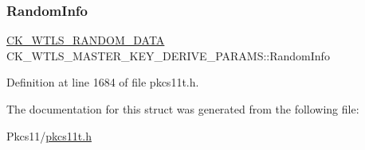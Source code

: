 \subsubsection{\texorpdfstring{Random\+Info}{RandomInfo}}
{\footnotesize\ttfamily \hyperlink{struct_c_k___w_t_l_s___r_a_n_d_o_m___d_a_t_a}{C\+K\+\_\+\+W\+T\+L\+S\+\_\+\+R\+A\+N\+D\+O\+M\+\_\+\+D\+A\+TA} C\+K\+\_\+\+W\+T\+L\+S\+\_\+\+M\+A\+S\+T\+E\+R\+\_\+\+K\+E\+Y\+\_\+\+D\+E\+R\+I\+V\+E\+\_\+\+P\+A\+R\+A\+M\+S\+::\+Random\+Info}



Definition at line 1684 of file pkcs11t.\+h.



The documentation for this struct was generated from the following file\+:\begin{DoxyCompactItemize}
\item 
Pkcs11/\hyperlink{pkcs11t_8h}{pkcs11t.\+h}\end{DoxyCompactItemize}
